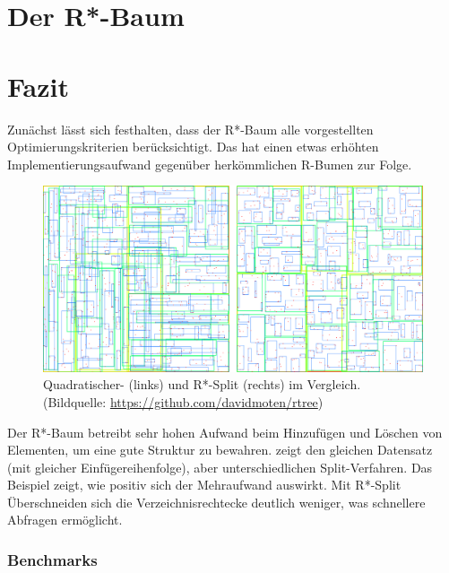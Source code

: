 \documentclass[runningheads,a4paper]{llncs}
\begin{document}
{\section{Der R*-Baum} %
\label{sec:rstar_tree}




\section{Fazit} %
\label{sec:fazit}

	Zunächst lässt sich festhalten, dass der R*-Baum alle vorgestellten Optimierungskriterien berücksichtigt. Das hat einen etwas erhöhten Implementierungsaufwand gegenüber herkömmlichen R-Bumen zur Folge.

	\begin{figure}[H]
		\centering
		\includegraphics[width=1\textwidth]{vergleich-quad-star.png}
		\caption{Quadratischer- (links) und R*-Split (rechts) im Vergleich. (Bildquelle: \url{https://github.com/davidmoten/rtree})}
		\label{fig:vergleich-quad-star}
	\end{figure}

	Der R*-Baum betreibt sehr hohen Aufwand beim Hinzufügen und Löschen von Elementen, um eine gute Struktur zu bewahren.  zeigt den gleichen Datensatz (mit gleicher Einfügereihenfolge), aber unterschiedlichen Split-Verfahren. Das Beispiel zeigt, wie positiv sich der Mehraufwand auswirkt. Mit R*-Split Überschneiden sich die Verzeichnisrechtecke deutlich weniger, was schnellere Abfragen ermöglicht.

	\subsubsection{Benchmarks} %
	\label{ssub:benchmarks}
	
}
\end{document}
